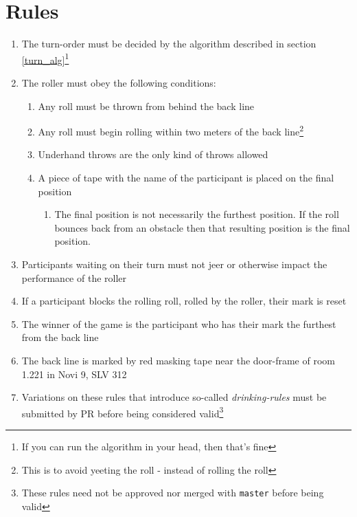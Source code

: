 \documentclass[12pt, a4paper]{article}
\begin{document}
\section{Rules}
\begin{enumerate}
    \item The turn-order must be decided by the algorithm described in section \ref{turn_alg}\footnote{If you can run the algorithm in your head, then that's fine}
    \item The roller must obey the following conditions:
    \begin{enumerate}
        \item Any roll must be thrown from behind the back line
        \item Any roll must begin rolling within two meters of the back line\footnote{This is to avoid yeeting the roll - instead of rolling the roll}
        \item Underhand throws are the only kind of throws allowed
        \item A piece of tape with the name of the participant is placed on the final position
        \begin{enumerate}
            \item The final position is not necessarily the furthest position. If the roll bounces back from an obstacle then that resulting position is the final position.
        \end{enumerate}
    \end{enumerate}
    \item Participants waiting on their turn must not jeer or otherwise impact the performance of the roller
    \item If a participant blocks the rolling roll, rolled by the roller, their mark is reset 
    \item The winner of the game is the participant who has their mark the furthest from the back line
    \item The back line is marked by red masking tape near the door-frame of room 1.221 in Novi 9, SLV 312
    \item Variations on these rules that introduce so-called \textit{drinking-rules} must be submitted by PR before being considered valid\footnote{These rules need not be approved nor merged with \texttt{master} before being valid}
\end{enumerate}

\pagebreak
\appendix
\end{document}
